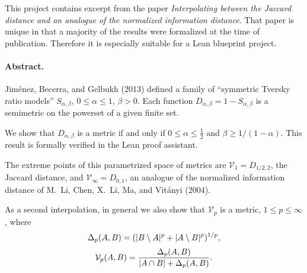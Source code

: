 %
This project contains excerpt from the paper \emph{Interpolating between the Jaccard distance and an analogue of the normalized information distance}. That paper is unique in that a majority of the results were formalized at the time of publication.
Therefore it is especially suitable for a Lean blueprint project.


\paragraph{Abstract.} Jim{\'e}nez, Becerra, and Gelbukh (2013) defined a family of ``symmetric Tversky ratio models'' $S_{\alpha,\beta}$, $0\le\alpha\le 1$, $\beta>0$. Each function $D_{\alpha,\beta}=1-S_{\alpha,\beta}$ is a semimetric on the powerset of a given finite set.

We show that $D_{\alpha,\beta}$ is a metric if and only if $0\le\alpha \le \frac12$ and $\beta\ge 1/(1-\alpha)$.
This result is formally verified in the Lean proof assistant.

The extreme points of this parametrized space of metrics are
$\mathcal V_1=D_{1/2,2}$, the Jaccard distance, and
$\mathcal V_{\infty}=D_{0,1}$, an analogue of the normalized information distance of M.~Li, Chen, X.~Li, Ma, and Vit\'anyi (2004).

As a second interpolation, in general we also show that $\mathcal V_p$ is a metric, $1\le p\le\infty$, where
\[
\Delta_p(A,B)=(\lvert B\setminus A\rvert^p+\lvert A\setminus B\rvert^p)^{1/p},
\]
\[
\mathcal V_p(A,B)=\frac{\Delta_p(A,B)}{\lvert A\cap B\rvert + \Delta_p(A,B)}.
\]
